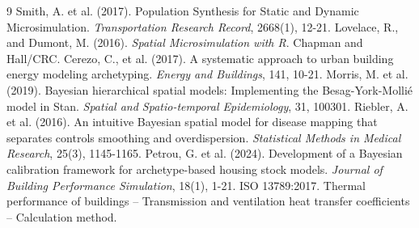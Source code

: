 \documentclass[11pt, a4paper]{article}
\begin{document}
\newpage

\begin{thebibliography}{9}
 Smith, A. et al. (2017). Population Synthesis for Static and Dynamic Microsimulation. \textit{Transportation Research Record}, 2668(1), 12-21.
 Lovelace, R., and Dumont, M. (2016). \textit{Spatial Microsimulation with R}. Chapman and Hall/CRC.
 Cerezo, C., et al. (2017). A systematic approach to urban building energy modeling archetyping. \textit{Energy and Buildings}, 141, 10-21.
 Morris, M. et al. (2019). Bayesian hierarchical spatial models: Implementing the Besag-York-Molli{\'e} model in Stan. \textit{Spatial and Spatio-temporal Epidemiology}, 31, 100301.
 Riebler, A. et al. (2016). An intuitive Bayesian spatial model for disease mapping that separates controls smoothing and overdispersion. \textit{Statistical Methods in Medical Research}, 25(3), 1145-1165.
 Petrou, G. et al. (2024). Development of a Bayesian calibration framework for archetype-based housing stock models. \textit{Journal of Building Performance Simulation}, 18(1), 1-21.
 ISO 13789:2017. Thermal performance of buildings -- Transmission and ventilation heat transfer coefficients -- Calculation method.
\end{thebibliography}
\end{document}
